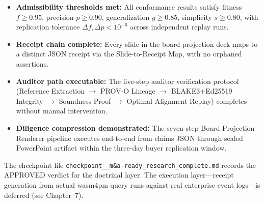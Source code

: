 \begin{itemize}
  \item \textbf{Admissibility thresholds met:} All conformance results satisfy fitness $f \ge
    0.95$, precision $p \ge 0.90$, generalization $g \ge 0.85$, simplicity $s \ge 0.80$, with
    replication tolerance $\Delta f, \Delta p < 10^{-6}$ across independent replay runs.
  \item \textbf{Receipt chain complete:} Every slide in the board projection deck maps to a
    distinct JSON receipt via the Slide-to-Receipt Map, with no orphaned assertions.
  \item \textbf{Auditor path executable:} The five-step auditor verification protocol
    (Reference Extraction $\to$ PROV-O Lineage $\to$ BLAKE3+Ed25519 Integrity $\to$ Soundness
    Proof $\to$ Optimal Alignment Replay) completes without manual intervention.
  \item \textbf{Diligence compression demonstrated:} The seven-step Board Projection Renderer
    pipeline executes end-to-end from claims JSON through sealed PowerPoint artifact within the
    three-day buyer replication window.
\end{itemize}

The checkpoint file \texttt{checkpoint\_\_m\&a-ready\_research\_complete.md} records the
APPROVED verdict for the doctrinal layer. The execution layer---receipt generation from actual
wasm4pm query runs against real enterprise event logs---is deferred (see Chapter~7).
